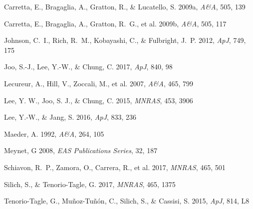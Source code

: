\documentclass{iau}
\begin{document}
\begin{thebibliography}{}


{Carretta, E., Bragaglia, A., Gratton, R., \& Lucatello, S.} 2009a, 
\textit{A\&A}, 505, 139 

{Carretta, E., Bragaglia, A., Gratton, R.~G., et al.} 2009b,
\textit{A\&A}, 505, 117 

{Johnson, C.~I., Rich, R.~M., Kobayashi, C., \& Fulbright, J.~P.} 2012, 
\textit{ApJ}, 749, 175 

{Joo, S.-J., Lee, Y.-W., \& Chung, C.} 2017,
\textit{ApJ}, 840, 98 

{Lecureur, A., Hill, V., Zoccali, M., et al.} 2007, 
\textit{A\&A}, 465, 799 

{Lee, Y. W., Joo, S. J., \& Chung, C.} 2015,
\textit{MNRAS}, 453, 3906 

{ Lee, Y.-W., \& Jang, S.} 2016, 
\textit{ApJ}, 833, 236

{Maeder, A.} 1992, 
\textit{A\&A}, 264, 105 

{Meynet, G} 2008, 
\textit{EAS Publications Series}, 32, 187 

{Schiavon, R.~P., Zamora, O., Carrera, R., et al.} 2017, 
\textit{MNRAS}, 465, 501 

{Silich, S., \& Tenorio-Tagle, G.} 2017, 
\textit{MNRAS}, 465, 1375 





{Tenorio-Tagle, G., Mu{\~n}oz-Tu{\~n}{\'o}n, C., Silich, S., \& Cassisi, S.} 2015, 
\textit{ApJ}, 814, L8




\end{thebibliography}
\end{document}
